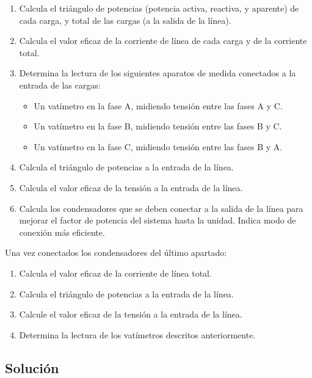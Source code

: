  \begin{enumerate}
 \item Calcula el triángulo de potencias (potencia activa, reactiva, y
   aparente) de cada carga, y total de las cargas (a la salida de la
   línea).
 \item Calcula el valor eficaz de la corriente de línea de
   cada carga y de la corriente total.
 \item Determina la lectura de los siguientes aparatos de medida
   conectados a la entrada de las cargas:
   \begin{itemize}
   \item Un vatímetro en la fase A, midiendo tensión entre las fases A
     y C.
   \item Un vatímetro en la fase B, midiendo tensión entre las fases B
     y C.
   \item Un vatímetro en la fase C, midiendo tensión entre las fases B
     y A.
   \end{itemize}
 \item Calcula el triángulo de potencias a la entrada de la línea.
 \item Calcula el valor eficaz de la tensión a la entrada de la línea.
 \item Calcula los condensadores que se deben conectar a la salida de
   la línea para mejorar el factor de potencia del sistema hasta la
   unidad. Indica modo de conexión más eficiente.
 \end{enumerate}

Una vez conectados los condensadores del último apartado:
\begin{enumerate}[resume]
\item Calcula el valor eficaz de la corriente de línea total.
\item Calcula el triángulo de potencias a la entrada de la línea.
\item Calcule el valor eficaz de la tensión a la entrada de la línea.
\item Determina la lectura de los vatímetros descritos anteriormente.
\end{enumerate}

\vspace{3mm}

\subsection*{Solución}

